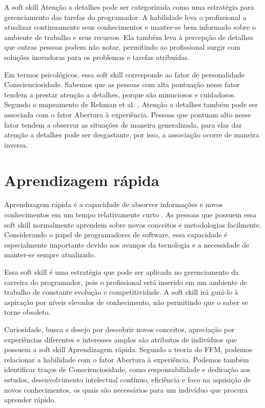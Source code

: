 A soft skill Atenção a detalhes pode ser categorizada como uma estratégia para gerenciamento das tarefas do programador. A habilidade leva o profissional a atualizar continuamente seus conhecimentos e manter-se bem informado sobre o ambiente de trabalho e seus recursos. Ela também leva à percepção de detalhes que outras pessoas podem não notar, permitindo ao profissional surgir com soluções inovadoras para os problemas e tarefas atribuídas.

Em termos psicológicos, essa soft skill corresponde ao fator de personalidade Conscienciosidade. Sabemos que as pessoas com alta pontuação nesse fator tendem a prestar atenção a detalhes, porque são minuciosos e cuidadosos. Segundo o mapeamento de Rehman et al. \cite{rehman:12}, Atenção a detalhes também pode ser associada com o fator Abertura à experiência. Pessoas que pontuam alto nesse fator tendem a observar as situações de maneira generalizada, para elas dar atenção a detalhes pode ser desgastante, por isso, a associação ocorre de maneira inversa.


\section{Aprendizagem rápida}

Aprendizagem rápida é a capacidade de absorver informações e novos conhecimentos em um tempo relativamente curto \cite{ahmed:12}. As pessoas que possuem essa soft skill normalmente aprendem sobre novos conceitos e metodologias facilmente. Considerando o papel de programadores de software, essa capacidade é especialmente importante devido aos avanços da tecnologia e a necessidade de manter-se sempre atualizado.

Essa soft skill é uma estratégia que pode ser aplicada no gerenciamento da carreira do programador, pois o profissional está inserido em um ambiente de trabalho de constante evolução e competitividade. A soft skill irá guiá-lo à aspiração por níveis elevados de conhecimento, não permitindo que o saber se torne obsoleto. 

Curiosidade, busca e desejo por descobrir novos conceitos, apreciação por experiências diferentes e interesses amplos são atributos de indivíduos que possuem a soft skill Aprendizagem rápida. Segundo a teoria do FFM, podemos relacionar a habilidade com o fator Abertura à experiência.
Podemos também identificar traços de Conscienciosidade, como responsabilidade e dedicação aos estudos, desenvolvimento intelectual contínuo, eficiência e foco na aquisição de novos conhecimentos, os quais são necessários para um indivíduo que procura aprender rápido.

